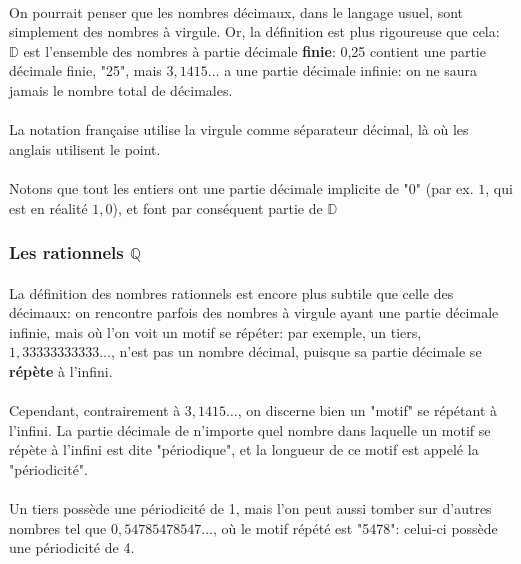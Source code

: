 \documentclass[a4paper]{book}
\begin{document}
    \paragraph{}
    On pourrait penser que les nombres décimaux, dans le langage usuel, sont simplement des nombres à virgule. Or, la définition est plus rigoureuse que cela: $\mathds{D}$ est l'ensemble des nombres à partie décimale \textbf{finie}: 0,25 contient une partie décimale finie, "25", mais $3,1415\dots$ a une partie décimale infinie: on ne saura jamais le nombre total de décimales.
    
    \paragraph{}
    La notation française utilise la virgule comme séparateur décimal, là où les anglais utilisent le point.
    
    \paragraph{}
    Notons que tout les entiers ont une partie décimale implicite de "0" (par ex. $1$, qui est en réalité $1,0$), et font par conséquent partie de $\mathds{D}$
    
    \subsubsection{Les rationnels $\mathds{Q}$}
    \paragraph{}
    La définition des nombres rationnels est encore plus subtile que celle des décimaux: on rencontre parfois des nombres à virgule ayant une partie décimale infinie, mais où l'on voit un motif se répéter: par exemple, un tiers, $1,33333333333\dots$, n'est pas un nombre décimal, puisque sa partie décimale se \textbf{répète} à l'infini. \\
    \paragraph{}
    Cependant, contrairement à $3,1415\dots$, on discerne bien un "motif" se répétant à l'infini. La partie décimale de n'importe quel nombre dans laquelle un motif se répète à l'infini est dite "périodique", et la longueur de ce motif est appelé la "périodicité".\\
    \paragraph{}
    Un tiers possède une périodicité de 1, mais l'on peut aussi tomber sur d'autres nombres tel que $0,54785478547\dots$, où le motif répété est "5478": celui-ci possède une périodicité de 4. \\
\end{document}

